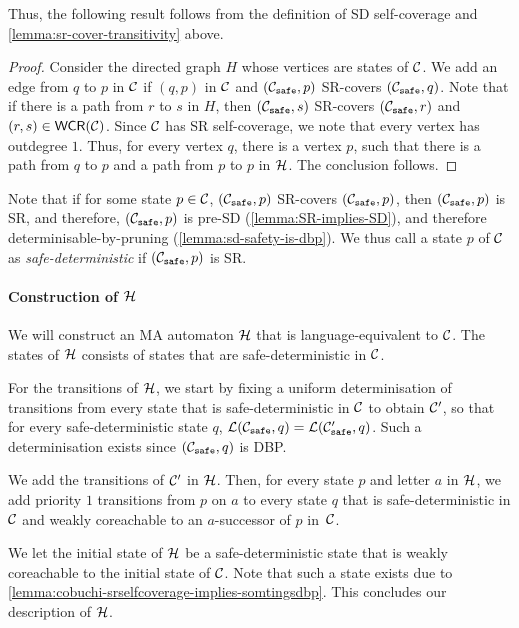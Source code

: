 Thus, the following result follows from the definition of SD self-coverage and \cref{lemma:sr-cover-transitivity} above.

\lemmacobuchisometingdbp*
\begin{proof}
    Consider the directed graph $H$ whose vertices are states of $\mathcal{C}$. We add an edge from $q$ to $p$ in $\mathcal{C}$ if $(q,p)$ in $\mathcal{C}$ and $(\mathcal{C}_{\texttt{safe}},p)$ SR-covers $(\mathcal{C}_{\texttt{safe}},q)$. Note that if there is a path from $r$ to $s$ in $H$, then $(\mathcal{C}_{\texttt{safe}},s)$ SR-covers $(\mathcal{C}_{\texttt{safe}},r)$ and $(r,s)\in\mathsf{WCR}(\mathcal{C})$. Since $\mathcal{C}$ has SR self-coverage, we note that every vertex has outdegree $1$. Thus, for every vertex $q$, there is a vertex $p$, such that there is a path from $q$ to $p$ and a path from $p$ to $p$ in $\mathcal{H}$. The conclusion follows.
\end{proof}

Note that if for some state $p \in \mathcal{C}$,  $(\mathcal{C}_{\texttt{safe}},p)$ SR-covers $(\mathcal{C}_{\texttt{safe}},p)$, then $(\mathcal{C}_{\texttt{safe}},p)$ is SR, and therefore, $(\mathcal{C}_{\texttt{safe}},p)$ is pre-SD (\cref{lemma:SR-implies-SD}), and therefore determinisable-by-pruning (\cref{lemma:sd-safety-is-dbp}). We thus call a state $p$ of $\mathcal{C}$ as \emph{safe-deterministic} if $(\mathcal{C}_{\texttt{safe}},p)$ is SR. 

\paragraph*{Construction of $\mathcal{H}$} We will construct an MA automaton $\mathcal{H}$ that is language-equivalent to $\mathcal{C}$. The states of $\mathcal{H}$ consists of states that are safe-deterministic in $\mathcal{C}$.

For the transitions of $\mathcal{H}$, we start by fixing a uniform determinisation of transitions from every state that is safe-deterministic in $\mathcal{C}$ to obtain $\mathcal{C}'$, so that for every safe-deterministic state $q$, $\mathcal{L}(\mathcal{C}_{\texttt{safe}},q)=\mathcal{L}(\mathcal{C}'_{\texttt{safe}},q)$. Such a determinisation exists since $(\mathcal{C}_{\texttt{safe}},q)$ is DBP. 

We add the transitions of $\mathcal{C}'$ in $\mathcal{H}$. Then, for every state $p$ and letter $a$ in $\mathcal{H}$, we add priority $1$ transitions from $p$ on $a$ to every state $q$ that is safe-deterministic in $\mathcal{C}$ and weakly coreachable to an $a$-successor of $p$ in~$\mathcal{C}$. 

We let the initial state of $\mathcal{H}$ be a safe-deterministic state that is weakly coreachable to the initial state of $\mathcal{C}$. Note that such a state exists due to \cref{lemma:cobuchi-srselfcoverage-implies-somtingsdbp}. This concludes our description of $\mathcal{H}$. 

